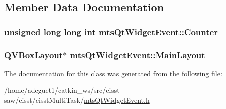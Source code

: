 \subsection{Member Data Documentation}
\hypertarget{classmts_qt_widget_event_aad5793fac31d42a9fc1bc8bcd2d265b8}{
\subsubsection[{Counter}]{\setlength{\rightskip}{0pt plus 5cm}unsigned long long int mts\-Qt\-Widget\-Event\-::\-Counter\hspace{0.3cm}{\ttfamily [protected]}}}\label{classmts_qt_widget_event_aad5793fac31d42a9fc1bc8bcd2d265b8}
\hypertarget{classmts_qt_widget_event_a9f914a226a59e9181130296046811466}{
\subsubsection[{Main\-Layout}]{\setlength{\rightskip}{0pt plus 5cm}Q\-V\-Box\-Layout$\ast$ mts\-Qt\-Widget\-Event\-::\-Main\-Layout\hspace{0.3cm}{\ttfamily [protected]}}}\label{classmts_qt_widget_event_a9f914a226a59e9181130296046811466}


The documentation for this class was generated from the following file\-:\begin{DoxyCompactItemize}
\item 
/home/adeguet1/catkin\-\_\-ws/src/cisst-\/saw/cisst/cisst\-Multi\-Task/\hyperlink{mts_qt_widget_event_8h}{mts\-Qt\-Widget\-Event.\-h}\end{DoxyCompactItemize}
